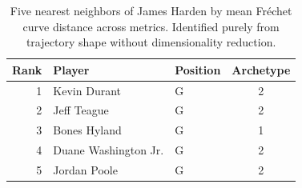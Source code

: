 \begin{table}[htbp]
  \centering\small
  \begin{tabular}{rllc}
    \toprule
    Rank & Player & Position & Archetype \\
    \midrule
    1 & Kevin Durant & G & 2 \\
    2 & Jeff Teague & G & 2 \\
    3 & Bones Hyland & G & 1 \\
    4 & Duane Washington Jr. & G & 2 \\
    5 & Jordan Poole & G & 2 \\
    \bottomrule
  \end{tabular}
  \caption{Five nearest neighbors of James Harden by mean Fr\'{e}chet curve distance across metrics. Identified purely from trajectory shape without dimensionality reduction.}
  \label{tab:James_Harden_frechet_curve_neighbors}
\end{table}

